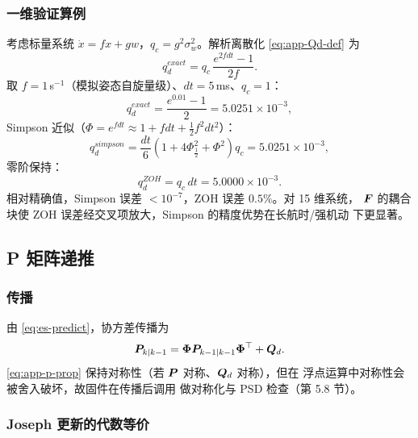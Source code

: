 \subsubsection{一维验证算例}

考虑标量系统 $\dot{x} = fx + gw$，$q_c = g^2\sigma_w^2$。解析离散化
\cref{eq:app-Qd-def} 为
\begin{equation}
  q_d^{exact} = q_c\,\frac{e^{2fdt} - 1}{2f}.
  \label{eq:app-qd-exact}
\end{equation}
取 $f = 1$\,s$^{-1}$（模拟姿态自旋量级）、$dt = 5$\,ms、$q_c = 1$：
\begin{equation}
  q_d^{exact} = \frac{e^{0.01} - 1}{2} = 5.0251\times10^{-3},
  \label{eq:app-qd-num}
\end{equation}
Simpson 近似（$\Phi = e^{fdt} \approx 1 + fdt + \frac12 f^2 dt^2$）：
\begin{equation}
  q_d^{simpson} = \frac{dt}{6}\left(1 + 4\Phi_{\frac12}^2 + \Phi^2\right)q_c
  = 5.0251\times10^{-3},
  \label{eq:app-qd-simpson-num}
\end{equation}
零阶保持：
\begin{equation}
  q_d^{ZOH} = q_c\,dt = 5.0000\times10^{-3}.
  \label{eq:app-qd-zoh-num}
\end{equation}
相对精确值，Simpson 误差 $<10^{-7}$，ZOH 误差 $0.5\%$。对 15 维系统，
$\boldsymbol{F}$ 的耦合块使 ZOH 误差经交叉项放大，Simpson 的精度优势在长航时/强机动
下更显著。

\subsection{P 矩阵递推}

\subsubsection{传播}

由 \cref{eq:es-predict}，协方差传播为
\begin{equation}
  \boldsymbol{P}_{k|k-1} = \bm{\Phi}\boldsymbol{P}_{k-1|k-1}\bm{\Phi}^{\top} + \boldsymbol{Q}_d.
  \label{eq:app-p-prop}
\end{equation}
\cref{eq:app-p-prop} 保持对称性（若 $\boldsymbol{P}$ 对称、$\boldsymbol{Q}_d$ 对称），但在
浮点运算中对称性会被舍入破坏，故固件在传播后调用
 做对称化与 PSD 检查（第 5.8 节）。

\subsubsection{Joseph 更新的代数等价}


